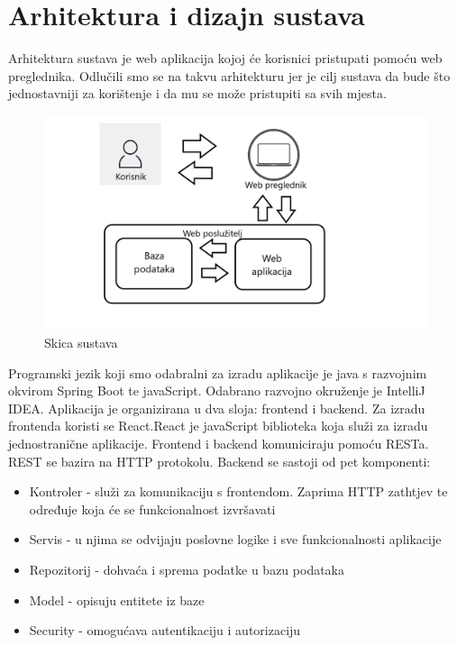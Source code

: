 \chapter{Arhitektura i dizajn sustava}
		
			Arhitektura sustava je web aplikacija kojoj će korisnici pristupati pomoću web preglednika. Odlučili smo se na takvu arhitekturu jer je cilj sustava da bude što jednostavniji za korištenje i da mu se može pristupiti sa svih mjesta.
			
			\begin{figure}[H]
				\includegraphics[scale=0.4]{slike/Skica_sustava.png} %
				\centering
				\caption{Skica sustava}
				\label{fig:sustav}
			\end{figure}
			
			Programski jezik koji smo odabralni za izradu aplikacije je java s razvojnim okvirom Spring Boot te javaScript. Odabrano razvojno okruženje je IntelliJ IDEA. 
			Aplikacija je organizirana u dva sloja: frontend i backend. Za izradu frontenda koristi se React.React je javaScript biblioteka koja služi za izradu jednostranične aplikacije. Frontend i backend komuniciraju pomoću RESTa. REST se bazira na HTTP protokolu. Backend se sastoji od pet komponenti:
		\begin{itemize}
		\item Kontroler - služi za komunikaciju s frontendom. Zaprima HTTP zathtjev te određuje koja će se funkcionalnost izvršavati
		\item Servis - u njima se odvijaju poslovne logike i sve funkcionalnosti aplikacije
		\item Repozitorij - dohvaća i sprema podatke u bazu podataka
		\item Model - opisuju entitete iz baze 
		\item Security - omogućava autentikaciju i autorizaciju 
	\end{itemize}


